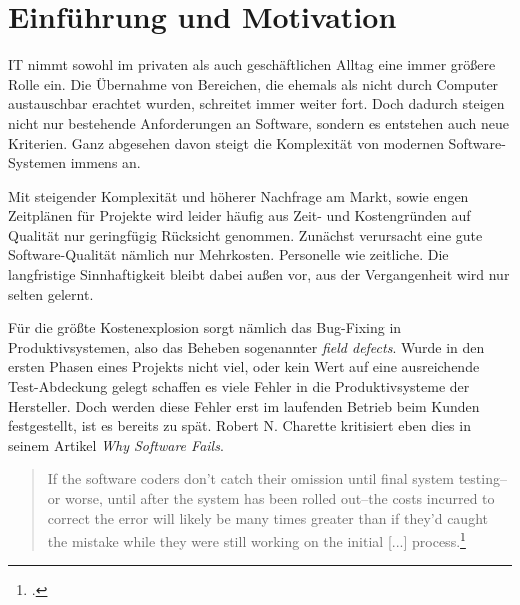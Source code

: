 \documentclass[12pt,a4paper,bibliography=totocnumbered,listof=totocnumbered]{scrartcl}
\begin{document}
\onehalfspacing
\renewcommand{\thesection}{\arabic{section}}
\renewcommand{\theHsection}{\arabic{section}}
\setcounter{section}{0}
\setcounter{page}{1}

\section{Einführung und Motivation}

IT nimmt sowohl im privaten als auch geschäftlichen Alltag eine immer größere Rolle ein. Die Übernahme von Bereichen, die ehemals als nicht durch Computer austauschbar erachtet wurden, schreitet immer weiter fort. Doch dadurch steigen nicht nur bestehende Anforderungen an Software, sondern es entstehen auch neue Kriterien. Ganz abgesehen davon steigt die Komplexität von modernen Software-Systemen immens an.

Mit steigender Komplexität und höherer Nachfrage am Markt, sowie engen Zeitplänen für Projekte wird leider häufig aus Zeit- und Kostengründen auf Qualität nur geringfügig Rücksicht genommen. Zunächst verursacht eine gute Software-Qualität nämlich nur Mehrkosten. Personelle wie zeitliche. Die langfristige Sinnhaftigkeit bleibt dabei außen vor, aus der Vergangenheit wird nur selten gelernt.

Für die größte Kostenexplosion sorgt nämlich das Bug-Fixing in Produktivsystemen, also das Beheben sogenannter \textit{field defects}. Wurde in den ersten Phasen eines Projekts nicht viel, oder kein Wert auf eine ausreichende Test-Abdeckung gelegt schaffen es viele Fehler in die Produktivsysteme der Hersteller. Doch werden diese Fehler erst im laufenden Betrieb beim Kunden festgestellt, ist es bereits zu spät. Robert N. Charette kritisiert eben dies in seinem Artikel \textit{Why Software Fails}.

\begin{quote}
	\begin{itshape}
	If the software coders don't catch their omission until final system testing--or worse, until after the system has been rolled out--the costs incurred to correct the error will likely be many times greater than if they'd caught the mistake while they were still working on the initial [...] process.\footcite{charette}
	\end{itshape}
\end{quote}
\end{document}
